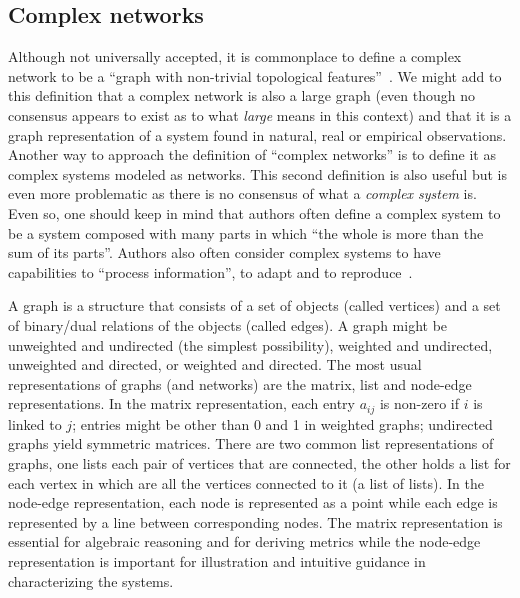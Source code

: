 \subsection{Complex networks}
Although not universally accepted, it is commonplace to define a complex network to be
a ``graph with non-trivial topological features''~\cite{newmanBook}.
We might add to this definition that a complex network is also a large graph (even though no consensus appears to exist as 
to what \emph{large} means in this context)
and that it is a graph representation of a system found in natural, real or empirical observations.
Another way to approach the definition of ``complex networks'' is to define it as
complex systems modeled as networks.
This second definition is also useful but is even more problematic as
there is no consensus of what a \emph{complex system} is.
Even so, one should keep in mind that authors often define a complex system
to be a system composed with many parts in which ``the whole is more than
the sum of its parts''.
Authors also often consider complex systems to have capabilities
to ``process information'', to adapt and to reproduce~\cite{complexity}.

A graph is a structure that consists of a set of objects (called vertices)
and a set of binary/dual relations of the objects (called edges).
A graph might be unweighted and undirected (the simplest possibility),
weighted and undirected, unweighted and directed, or weighted and directed. The most usual representations of graphs (and networks) are the matrix, list and node-edge representations.
In the matrix representation, each entry $a_{ij}$ is non-zero if $i$ is linked to $j$;
entries might be other than 0 and 1 in weighted graphs; undirected graphs yield symmetric matrices.
There are two common list representations of graphs, one lists each pair of vertices that are connected,
the other holds a list for each vertex in which are all the vertices connected to it (a list of lists).
In the node-edge representation, each node is represented as a point while each edge is represented
by a line between corresponding nodes.
The matrix representation is essential for algebraic reasoning and for deriving metrics
while the node-edge representation is important for illustration and intuitive guidance
in characterizing the systems.

